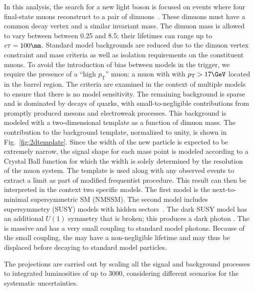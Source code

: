In this analysis, the search for a new light boson is focused on events where four final-state muons reconstruct to a pair of dimuons~\cite{CMS-PAS-HIG-18-003}. These dimuons must have a common decay vertex and a similar invariant mass. The dimuon mass is allowed to vary between between 0.25 and 8.5\GeV; their lifetimes can range up to $c\tau=100\mm$. Standard model backgrounds are reduced due to the dimuon vertex constraint and mass criteria as well as isolation requirements on the constituent muons. To avoid the introduction of bias between models in the trigger, we require the presence of a ``high $p_\mathrm{T}$'' muon: a muon with with $p_\mathrm{T} > 17\GeV$ located in the barrel region. The criteria are examined in the context of multiple models to ensure that there is no model sensitivity. The remaining background is sparse and is dominated by decays of \bbbar quarks, with small-to-negligible contributions from promptly produced \JPsi mesons and electroweak processes. This background is modeled with a two-dimensional template as a function of dimuon mass. The \bbbar contribution to the background template, normalized to unity, is shown in Fig.~\ref{fig:2dtemplate}. Since the width of the new particle is expected to be extremely narrow, the signal shape for each mass point is modeled according to a Crystal Ball \cite{Oreglia:1980cs} function for which the width is solely determined by the resolution of the muon system. The template is used along with any observed events to extract a limit as part of modified frequentist procedure. This result can then be interpreted in the context two specific models. The first model is the next-to-minimal supersymmetric SM (NMSSM). The second model includes supersymmetry (SUSY) models with hidden sectors~\cite{ArkaniHamed:2008qn, Baumgart:2009tn, Falkowski:2010cm}. The dark SUSY model has an additional $U(1)$ symmetry that is broken; this produces a dark photon \gammaDark. The \gammaDark is massive and has a very small coupling to standard model photons. Because of the small coupling, the \gammaDark may have a non-negligible lifetime and may thus be displaced before decaying to standard model particles.

The projections are carried out by scaling all the signal and background processes to integrated luminosities of up to 3000\fbinv, considering different scenarios for the
systematic uncertainties. 


